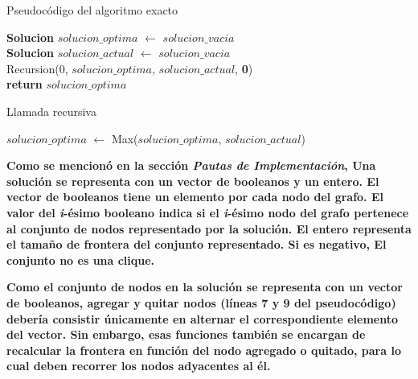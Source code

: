 \begin{algorithm}[H]
	{\color{dGray}
	\caption{Pseudocódigo del algoritmo exacto}
	\textbf{Solucion} $solucion\_optima$ $\leftarrow$ $solucion\_vacia$\\
	\textbf{Solucion} $solucion\_actual$ $\leftarrow$ $solucion\_vacia$\\
	Recursion(0, $solucion\_optima$, $solucion\_actual$, \textbf{{\color{black}0}})\\
	\textbf{return} $solucion\_optima$
	}
\end{algorithm}

\begin{algorithm}[H]
	{\color{dGray}
	\caption{Llamada recursiva}
	$solucion\_optima$ $\leftarrow$ Max($solucion\_optima$, $solucion\_actual$)\\
	}
	\textbf{}
	{\color{dGray}
	}
\end{algorithm}

\par{\textbf{Como se mencionó en la sección \textit{Pautas de Implementación},
Una solución se representa con un vector de booleanos y un entero. El vector
de booleanos tiene un elemento por cada nodo del grafo. El valor del
\textit{i}-ésimo booleano indica si el \textit{i}-ésimo nodo del grafo
pertenece al conjunto de nodos representado por la solución. El entero
representa el tamaño de frontera del conjunto representado. Si es negativo,
El conjunto no es una clique.}}\\

\par{\textbf{Como el conjunto de nodos en la solución se representa con un
vector de booleanos, agregar y quitar nodos (líneas 7 y 9 del pseudocódigo)
debería consistir únicamente en alternar el correspondiente elemento del
vector. Sin embargo, esas funciones también se encargan de recalcular la
frontera en función del nodo agregado o quitado, para lo cual deben recorrer los
nodos adyacentes al él.}}\\


